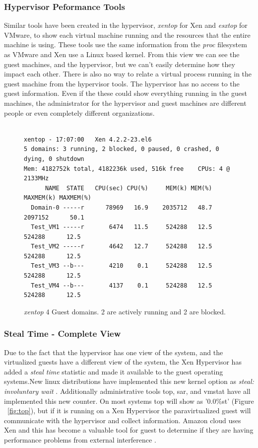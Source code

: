 \subsubsection{Hypervisor Peformance Tools}
Similar tools have been created in the hypervisor, \emph{xentop} for Xen and \emph{esxtop} for VMware, to show each virtual machine running and the resources that the entire machine is using.  
These tools use the same information from the \emph{proc} filesystem as VMware and Xen use a Linux based kernel.  
From this view we can see the guest machines, and the hypervisor, but we can't easily determine how they impact each other.  There is also no way to relate a virtual process running in the guest machine from the hypervisor tools.  The hypervisor has no access to the guest information.
Even if the these could show everything running in the guest machines, the administrator for the hypervisor and guest machines are different people or even completely different organizations. 

\begin{figure}[h]
\begin{Verbatim}

xentop - 17:07:00   Xen 4.2.2-23.el6
5 domains: 3 running, 2 blocked, 0 paused, 0 crashed, 0 dying, 0 shutdown
Mem: 4182752k total, 4182236k used, 516k free    CPUs: 4 @ 2133MHz
      NAME  STATE   CPU(sec) CPU(%)     MEM(k) MEM(%)  MAXMEM(k) MAXMEM(%) 
  Domain-0 -----r      78969   16.9    2035712   48.7    2097152      50.1    
  Test_VM1 -----r	    6474   11.5     524288   12.5     524288      12.5     
  Test_VM2 -----r	    4642   12.7     524288   12.5     524288      12.5 
  Test_VM3 --b---	    4210    0.1     524288   12.5     524288      12.5     
  Test_VM4 --b---	    4137    0.1     524288   12.5     524288      12.5  
\end{Verbatim}
\caption{\emph{xentop} 4 Guest domains. 2 are actively running and 2 are blocked.}
\label{fig:xentop}
\end{figure}

\subsubsection{Steal Time - Complete View}
Due to the fact that the hypervisor has one view of the system, and the virtualized guests have a different view of the system, the Xen Hypervisor has added a \emph{steal time} statistic and made it available to the guest operating systems.New linux distributions have implemented this new kernel option as \emph{steal: involuntary wait} \cite{proc}.  Additionally administrative tools top, sar, and vmstat have all implemented this new counter.  
On most systems top will show as '0.0\%st' (Figure ~\ref{fig:top}), but if it is running on a Xen Hypervisor the paravirtualized guest will communicate with the hypervisor and collect information. Amazon cloud uses Xen and this has become a valuable tool for guest to determine if they are having performance problems from external interference \cite{netflix}.

